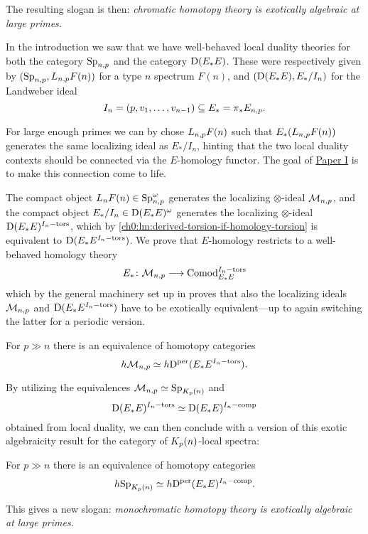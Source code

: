 The resulting slogan is then: \emph{chromatic homotopy theory is exotically algebraic at large primes.} 

In the introduction we saw that we have well-behaved local duality theories for both the category $\mathrm{Sp}_{n,p}$ and the category $\mathrm{D}(E_*E)$. These were respectively given by $(\mathrm{Sp}_{n,p}, L_{n,p} F(n))$ for a type $n$ spectrum $F(n)$, and $(\mathrm{D}(E_*E), E_*/I_n)$ for the Landweber ideal 
\[I_n=(p, v_1, \ldots, v_{n-1})\subseteq E_*= \pi_* E_{n,p}.\]

For large enough primes we can by \cite[6.12]{barthel-schlank-stapleton_2020} chose $L_{n,p} F(n)$ such that $E_* (L_{n,p} F(n))$ generates the same localizing ideal as $E_*/I_n$, hinting that the two local duality contexts should be connected via the $E$-homology functor. The goal of \hyperref[ch1]{Paper I} is to make this connection come to life. 

The compact object $L_n F(n)\in \mathrm{Sp}_{n,p}^\omega$ generates the localizing $\otimes$-ideal $\mathcal{M}_{n,p}$, and the compact object $E_*/I_n \in \mathrm{D}(E_*E)^\omega$ generates the localizing $\otimes$-ideal $\mathrm{D}(E_*E)^{I_n-\mathrm{tors}}$, which by \cref{ch0:lm:derived-torsion-if-homology-torsion} is equivalent to $\mathrm{D}(E_*E^{I_n-\mathrm{tors}})$. We prove that $E$-homology restricts to a well-behaved homology theory 
\[E_*\colon \mathcal{M}_{n,p}\longrightarrow \mathrm{Comod}_{E_*E}^{I_n-\mathrm{tors}}\] 
which by the general machinery set up in \cite{patchkoria-pstragowski_2021} proves that also the localizing ideals $\mathcal{M}_{n,p}$ and $\mathrm{D}(E_*E^{I_n-\mathrm{tors}})$ have to be exotically equivalent---up to again switching the latter for a periodic version. 

\begin{theorem}
    \label{ch0:summary1:thm:B}
    For $p\gg n$ there is an equivalence of homotopy categories
    \[h \mathcal{M}_{n,p} \simeq h \mathrm{D}^{\mathrm{per}}(E_*E^{I_n-\mathrm{tors}}).\]
\end{theorem}

By utilizing the equivalences $\mathcal{M}_{n,p} \simeq \mathrm{Sp}_{K_p(n)}$ and 
\[\mathrm{D}(E_*E)^{I_n-\mathrm{tors}} \simeq \mathrm{D}(E_*E)^{I_n-\mathrm{comp}}\] 
obtained from local duality, we can then conclude with a version of this exotic algebraicity result for the category of ${K_p(n)}$-local spectra: 

\begin{theorem}
    \label{ch0:summary1:thm:A}
    For $p \gg n$ there is an equivalence of homotopy categories
    \[h \mathrm{Sp}_{K_p(n)} \simeq h \mathrm{D}^{\mathrm{per}}(E_*E)^{I_n-\mathrm{comp}}.\]
\end{theorem}

This gives a new slogan: \emph{monochromatic homotopy theory is exotically algebraic at large primes.} 

